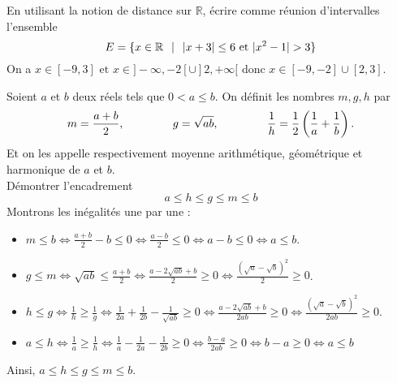 \documentclass[11pt]{article}
\begin{document}
\begin{exercice}{}{}
    En utilisant la notion de distance sur $\mathbb{R}$, écrire comme réunion d'intervalles l'ensemble
    \begin{equation*}
        E=\{x\in\mathbb{R} \hspace{0.25cm} | \hspace{0.25cm} |x+3| \leq 6 \text{ et } |x^2-1| > 3\}
    \end{equation*}
    \tcblower
    On a $x\in[-9,3] \text{ et } x\in]-\infty, -2[\cup]2,+\infty[$ donc $x\in[-9,-2]\cup[2,3]$.
\end{exercice}

\begin{exercice}{}{}
    Soient $a$ et $b$ deux réels tels que $0 < a \leq b$. On définit les nombres $m,g,h$ par
    \begin{equation*}
        m=\frac{a+b}{2}, \hspace{1.5cm} g=\sqrt{ab}, \hspace{1.5cm} \frac{1}{h}=\frac{1}{2}\left(\frac{1}{a}+\frac{1}{b}\right).
    \end{equation*}
    Et on les appelle respectivement moyenne arithmétique, géométrique et harmonique de $a$ et $b$.\\
    Démontrer l'encadrement
    \begin{equation*}
        a \leq h \leq g \leq m \leq b
    \end{equation*}
    \tcblower
    Montrons les inégalités une par une :
    \begin{itemize}
        \item $m \leq b \iff \frac{a+b}{2}-b\leq 0 \iff \frac{a-b}{2} \leq 0 \iff a - b \leq 0 \iff a \leq b$.
        \item $g \leq m \iff \sqrt{ab} \leq \frac{a+b}{2} \iff \frac{a - 2\sqrt{ab} + b}{2} \geq 0 \iff \frac{(\sqrt{a}-\sqrt{b})^2}{2} \geq 0$.
        \item $h \leq g \iff \frac{1}{h} \geq \frac{1}{g} \iff \frac{1}{2a}+\frac{1}{2b}-\frac{1}{\sqrt{ab}} \geq 0 \iff \frac{a-2\sqrt{ab}+b}{2ab} \geq 0 \iff \frac{(\sqrt{a}-\sqrt{b})^2}{2ab}\geq0$.
        \item $a \leq h \iff \frac{1}{a} \geq \frac{1}{h} \iff \frac{1}{a}-\frac{1}{2a}-\frac{1}{2b}\geq 0 \iff \frac{b-a}{2ab}\geq0 \iff b-a\geq 0 \iff a \leq b$
    \end{itemize}
    Ainsi, $a\leq h \leq g \leq m \leq b$.
\end{exercice}
\end{document}
